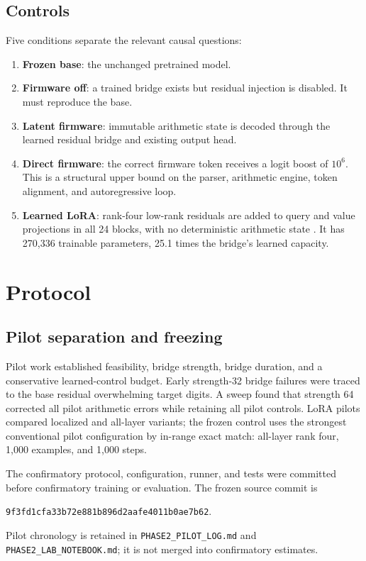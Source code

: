 \documentclass[11pt]{article}
\newcommand{\code}[1]{\texttt{#1}}
\begin{document}
\subsection{Controls}

Five conditions separate the relevant causal questions:

\begin{enumerate}
  \item \textbf{Frozen base}: the unchanged pretrained model.
  \item \textbf{Firmware off}: a trained bridge exists but residual injection
  is disabled. It must reproduce the base.
  \item \textbf{Latent firmware}: immutable arithmetic state is decoded through
  the learned residual bridge and existing output head.
  \item \textbf{Direct firmware}: the correct firmware token receives a
  logit boost of \(10^6\). This is a structural upper bound on the parser,
  arithmetic engine, token alignment, and autoregressive loop.
  \item \textbf{Learned LoRA}: rank-four low-rank residuals are added to query
  and value projections in all 24 blocks, with no deterministic arithmetic
  state \cite{hu2021}. It has 270,336 trainable parameters, 25.1 times the
  bridge's learned capacity.
\end{enumerate}

\section{Protocol}

\subsection{Pilot separation and freezing}

Pilot work established feasibility, bridge strength, bridge duration, and a
conservative learned-control budget. Early strength-32 bridge failures were
traced to the base residual overwhelming target digits. A sweep found that
strength 64 corrected all pilot arithmetic errors while retaining all pilot
controls. LoRA pilots compared localized and all-layer variants; the frozen
control uses the strongest conventional pilot configuration by in-range exact
match: all-layer rank four, 1,000 examples, and 1,000 steps.

The confirmatory protocol, configuration, runner, and tests were committed
before confirmatory training or evaluation. The frozen source commit is
\begin{sloppypar}
\code{9f3fd1cfa33b72e881b896d2aafe4011b0ae7b62}.
\end{sloppypar}
Pilot chronology is retained in \code{PHASE2\_PILOT\_LOG.md} and
\code{PHASE2\_LAB\_NOTEBOOK.md}; it is not merged into confirmatory estimates.
\end{document}
